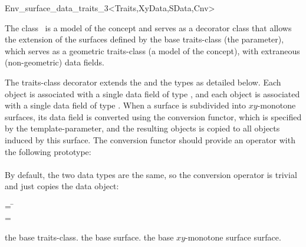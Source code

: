 
\ccRefPageBegin
\begin{ccRefClass}{Env_surface_data_traits_3<Traits,XyData,SData,Cnv>}

\ccDefinition

The class \ccRefName\ is a model of the  concept
and serves as a decorator class that allows the extension of the surfaces
defined by the base traits-class (the  parameter), which serves
as a geometric traits-class (a model of the  concept),
with extraneous (non-geometric) data fields.

The traits-class decorator extends the  and the
 types as detailed below.
Each  object is associated with a single data field of type
, and each  object is associated with
a single data field of type . When a surface is
subdivided into $xy$-monotone surfaces, its data field is converted using
the conversion functor, which is specified by the  template-parameter,
and the resulting objects is copied to all  objects
induced by this surface. The conversion functor should provide an operator with
the following prototype: \\
\indent {} \\

By default, the two data types are the same, so the conversion operator
is trivial and just copies the data object:
\begin{tabbing}
 = \=\\
 = \>
\end{tabbing}

 
\ccIsModel

\ccTypes

    {the base traits-class.}
\ccGlue
{}
    {the base surface.}
\ccGlue
{}
    {the base $xy$-monotone surface surface.}


\end{ccRefClass}
